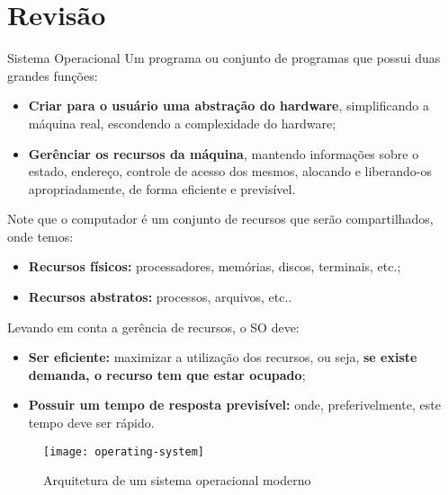 \chapter{Revisão}

\begin{definicao}{Sistema Operacional}
  Um programa ou conjunto de programas que possui duas grandes funções:
  \begin{itemize}
    \item \textbf{Criar para o usuário uma abstração do hardware}, simplificando a máquina real, escondendo a complexidade do hardware;

    \item \textbf{Gerênciar os recursos da máquina}, mantendo informações sobre o estado, endereço, controle de acesso dos mesmos, alocando e liberando-os apropriadamente, de forma eficiente e previsível.
  \end{itemize}
\end{definicao}

Note que o computador é um conjunto de recursos que serão compartilhados, onde temos:
\begin{itemize}
  \item \textbf{Recursos físicos:} processadores, memórias, discos, terminais, etc.;

  \item \textbf{Recursos abstratos:} processos, arquivos, etc..
\end{itemize}

Levando em conta a gerência de recursos, o SO deve:
\begin{itemize}
  \item \textbf{Ser eficiente:} maximizar a utilização dos recursos, ou seja, \textbf{se existe demanda, o recurso tem que estar ocupado};

  \item \textbf{Possuir um tempo de resposta previsível:} onde, preferivelmente, este tempo deve ser rápido.
\end{itemize}

\begin{figure}[h]
  \centering
  \texttt{[image: operating-system]}
  \caption{Arquitetura de um sistema operacional moderno}
  \label{fig:operating-system}
\end{figure}














